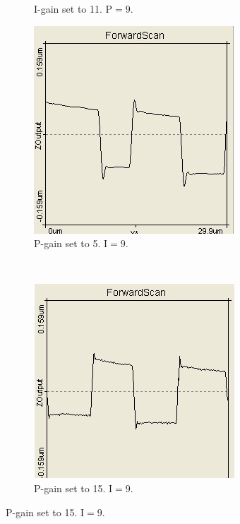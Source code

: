\documentclass[paper=a4,fontsize=10pt,DIV=18,twocolumn,parskip=half]{scrartcl}
\numberwithin{equation}{section}    %
\begin{document}
\begin{figure}
\begin{subfigure}{0.45\columnwidth}
        \caption{I-gain set to 11. 
        $\mathrm{P}=9$.}
        \label{vielI}
    \end{subfigure}
     
    \begin{subfigure}{0.45\columnwidth}
        \includegraphics[width=\textwidth]{Bilder/wenigP}
        \caption{P-gain set to 5. 
        $\mathrm{I}=9$.}
        \label{wenigP}
    \end{subfigure}
    ~
    \begin{subfigure}{0.45\columnwidth}
        \includegraphics[width=\textwidth]{Bilder/vielP}
        \caption{P-gain set to 15. 
        $\mathrm{I}=9$.}
        \label{vielP}
    \end{subfigure}
    

\end{figure}
\end{document}
